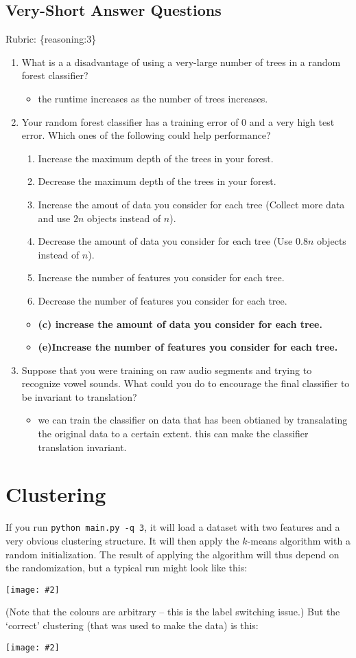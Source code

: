 \documentclass{article}
\def\gre#1{{\color{gre}#1}}
\newcommand{\centerfig}[2]{\begin{center}\texttt{[image: \#2]}\end{center}}
\def\items#1{\begin{itemize}#1\end{itemize}}
\def\enum#1{\begin{enumerate}#1\end{enumerate}}
\def\rubric#1{\gre{Rubric: \{#1\}}}{}
\begin{document}
\subsection{Very-Short Answer Questions}
\rubric{reasoning:3}

\enum{
\item What is a a disadvantage of using a very-large number of trees in a random forest classifier?
\items{
\item the runtime  increases as the number of trees increases.
}
\item Your random forest classifier has a training error of 0 and a very high test error. Which ones of the following could help performance?
\enum{
\item Increase the maximum depth of the trees in your forest.
\item Decrease the maximum depth of the trees in your forest.
\item Increase the amout of data you consider for each tree (Collect more data and use $2n$ objects instead of $n$).
\item Decrease the amount of data you consider for each tree (Use $0.8n$ objects instead of $n$).
\item Increase the number of features you consider for each tree.
\item Decrease the number of features you consider for each tree.
}
\items{
\item \bf{(c) increase the amount of data you consider for each tree.}
\item \bf{(e)Increase the number of features you consider for each tree.}
}
\item Suppose that you were training on raw audio segments and trying to recognize vowel sounds. What could you do to encourage the final classifier to be invariant to translation?
\items{
\item we can train the classifier on data that has been obtianed by transalating the original data to a certain extent. this can make the classifier translation invariant.
}
}


\section{Clustering}

If you run \verb|python main.py -q 3|, it will load a dataset with two features
and a very obvious clustering structure. It will then apply the $k$-means algorithm
with a random initialization. The result of applying the
algorithm will thus depend on the randomization, but a typical run might look like this:
\centerfig{.5}{../figs/kmeans_basic.png}
(Note that the colours are arbitrary -- this is the label switching issue.)
But the `correct' clustering (that was used to make the data) is this:
\centerfig{.5}{../figs/kmeans_good.png}
\end{document}
